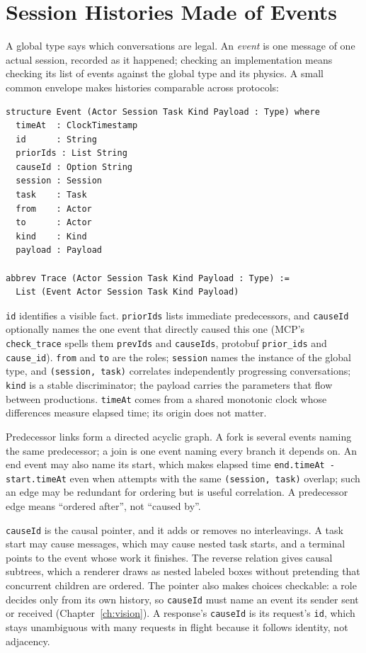 \chapter{Session Histories Made of Events}
\label{ch:events}

A global type says which conversations are legal. An \emph{event} is one message
of one actual session, recorded as it happened; checking an implementation means
checking its list of events against the global type and its physics. A small
common envelope makes histories comparable across protocols:

\begin{lstlisting}
structure Event (Actor Session Task Kind Payload : Type) where
  timeAt  : ClockTimestamp
  id      : String
  priorIds : List String
  causeId : Option String
  session : Session
  task    : Task
  from    : Actor
  to      : Actor
  kind    : Kind
  payload : Payload

abbrev Trace (Actor Session Task Kind Payload : Type) :=
  List (Event Actor Session Task Kind Payload)
\end{lstlisting}

\texttt{id} identifies a visible fact. \texttt{priorIds} lists immediate
predecessors, and \texttt{causeId} optionally names the one event that directly
caused this one (MCP's \texttt{check\_trace} spells them \texttt{prevIds} and
\texttt{causeIds}, protobuf \texttt{prior\_ids} and \texttt{cause\_id}).
\texttt{from} and \texttt{to} are the roles; \texttt{session} names the instance
of the global type, and \texttt{(session, task)} correlates independently
progressing conversations; \texttt{kind} is a stable discriminator; the payload
carries the parameters that flow between productions. \texttt{timeAt} comes from
a shared monotonic clock whose differences measure elapsed time; its origin does
not matter.

Predecessor links form a directed acyclic graph. A fork is several events naming
the same predecessor; a join is one event naming every branch it depends on. An
end event may also name its start, which makes elapsed time
\texttt{end.timeAt - start.timeAt} even when attempts with the same
\texttt{(session, task)} overlap; such an edge may be redundant for ordering but is
useful correlation. A predecessor edge means ``ordered after'', not ``caused by''.

\texttt{causeId} is the causal pointer, and it adds or removes no interleavings. A
task start may cause messages, which may cause nested task starts, and a terminal
points to the event whose work it finishes. The reverse relation gives causal
subtrees, which a renderer draws as nested labeled boxes without pretending that
concurrent children are ordered. The pointer also makes choices checkable: a role
decides only from its own history, so \texttt{causeId} must name an event its
sender sent or received (Chapter~\ref{ch:vision}). A response's \texttt{causeId}
is its request's \texttt{id}, which stays unambiguous with many requests in flight
because it follows identity, not adjacency.

